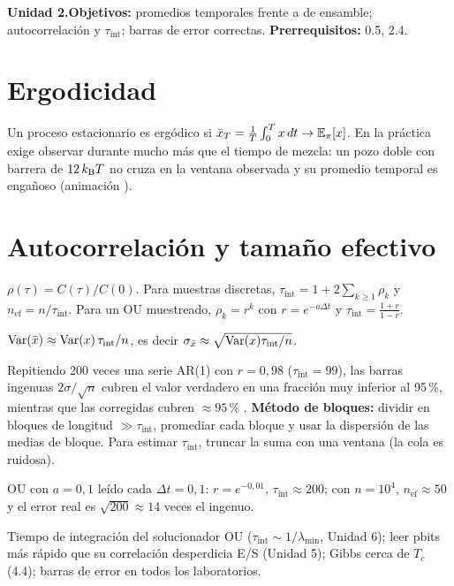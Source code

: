 \documentclass[11pt,a4paper]{article}
\begin{document}

\noindent\textbf{Unidad 2.}\quad\textbf{Objetivos:} promedios temporales frente a de ensamble; autocorrelación y
$\tau_{\text{int}}$; barras de error correctas. \textbf{Prerrequisitos:} 0.5, 2.4.

\section{Ergodicidad}
Un proceso estacionario es ergódico si $\bar x_T=\frac1T\int_0^Tx\,dt\to\mathbb{E}_\pi[x]$. En la práctica exige observar durante
mucho más que el tiempo de mezcla: un pozo doble con barrera de $12\,k_{\mathrm B} T$ no cruza en la ventana observada y su promedio
temporal es engañoso (animación \evS).

\section{Autocorrelación y tamaño efectivo}
$\rho(\tau)=C(\tau)/C(0)$. Para muestras discretas, $\tau_{\text{int}}=1+2\sum_{k\ge1}\rho_k$ y $n_{\text{ef}}=n/\tau_{\text{int}}$.
Para un OU muestreado, $\rho_k=r^k$ con $r=e^{-a\Delta t}$ y $\tau_{\text{int}}=\frac{1+r}{1-r}$.
\begin{resultado}
$\operatorname{Var}(\bar x)\approx\operatorname{Var}(x)\,\tau_{\text{int}}/n$, es decir $\sigma_{\bar x}\approx\sqrt{\operatorname{Var}(x)\tau_{\text{int}}/n}$.
\end{resultado}
Repitiendo 200 veces una serie AR(1) con $r=0{,}98$ ($\tau_{\text{int}}=99$), las barras ingenuas $2\sigma/\sqrt n$ cubren el valor
verdadero en una fracción muy inferior al 95\,\%, mientras que las corregidas cubren $\approx95\,\%$ \evS.
\textbf{Método de bloques:} dividir en bloques de longitud $\gg\tau_{\text{int}}$, promediar cada bloque y usar la dispersión
de las medias de bloque. Para estimar $\tau_{\text{int}}$, truncar la suma con una ventana (la cola es ruidosa).

\begin{ejemplo}
OU con $a=0{,}1$ leído cada $\Delta t=0{,}1$: $r=e^{-0{,}01}$, $\tau_{\text{int}}\approx200$; con $n=10^4$, $n_{\text{ef}}\approx50$ y el
error real es $\sqrt{200}\approx14$ veces el ingenuo.
\end{ejemplo}

\begin{aplicacion}
Tiempo de integración del solucionador OU ($\tau_{\text{int}}\sim1/\lambda_{\min}$, Unidad 6); leer pbits más rápido que su
correlación desperdicia E/S (Unidad 5); Gibbs cerca de $T_c$ (4.4); barras de error en todos los laboratorios.
\end{aplicacion}
\end{document}
